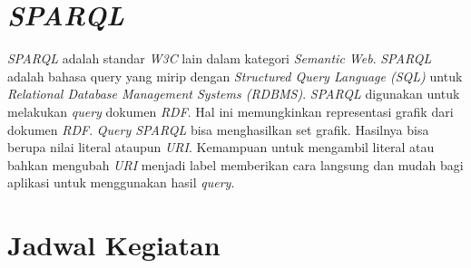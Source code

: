 \section{\emph{SPARQL}}
\emph{SPARQL} adalah standar \emph{W3C} lain dalam kategori \emph{Semantic Web}. \emph{SPARQL} adalah bahasa query yang mirip dengan \emph{Structured Query Language (SQL)} untuk \emph{Relational Database Management Systems (RDBMS)}. \emph{SPARQL} digunakan untuk melakukan \emph{query} dokumen \emph{RDF}. Hal ini memungkinkan representasi grafik dari dokumen \emph{RDF}. \emph{Query SPARQL} bisa menghasilkan set grafik. Hasilnya bisa berupa nilai literal ataupun \emph{URI}. Kemampuan untuk mengambil literal atau bahkan mengubah \emph{URI} menjadi label memberikan cara langsung dan mudah bagi aplikasi untuk menggunakan hasil \emph{query}.

\section{Jadwal Kegiatan}

